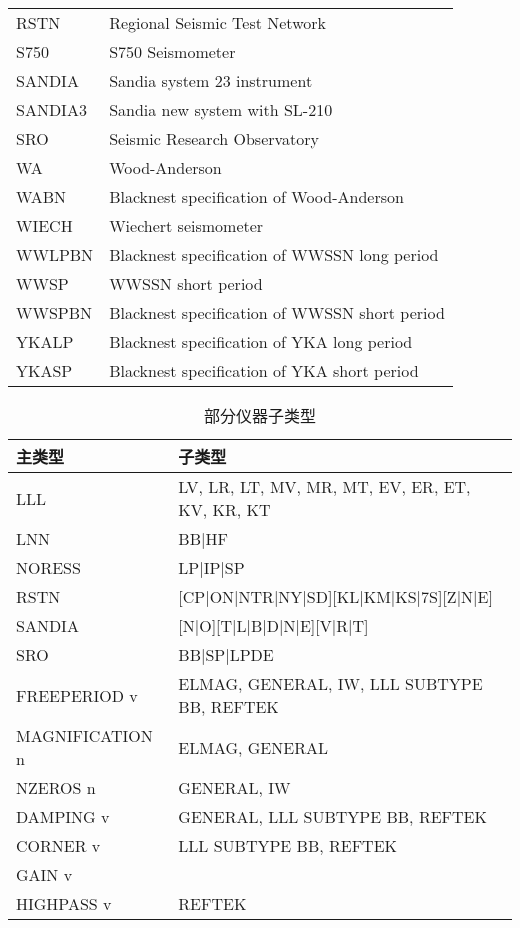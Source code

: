 \begin{table}[tp]
\begin{tabular}{ll}
RSTN     &  Regional Seismic Test Network	\\
S750     &  S750 Seismometer	\\
SANDIA   &  Sandia system 23 instrument	\\
SANDIA3  &  Sandia new system with SL-210	\\
SRO      &  Seismic Research Observatory	\\
WA       &  Wood-Anderson	\\	
WABN     &  Blacknest specification of Wood-Anderson	\\
WIECH    &  Wiechert seismometer	\\
WWLPBN   &  Blacknest specification of WWSSN long period	\\
WWSP     &  WWSSN short period	\\
WWSPBN   &  Blacknest specification of WWSSN short period	\\
YKALP    &  Blacknest specification of YKA long period	\\
YKASP    &  Blacknest specification of YKA short period	\\
\bottomrule
\end{tabular}
\end{table}

\begin{table}[htb]
\centering
\ttfamily
\small
\caption{部分仪器子类型}
\label{table:instrument-subtype}
\begin{tabular}{ll}
\toprule
主类型	&	子类型	\\
\midrule
LLL       &       LV, LR, LT, MV, MR, MT, EV, ER, ET, KV, KR, KT	\\
LNN       &    	  BB|HF	                                \\
NORESS    &   	  LP|IP|SP	                            \\
RSTN      &    	  [CP|ON|NTR|NY|SD][KL|KM|KS|7S][Z|N|E]	\\
SANDIA    &   	  [N|O][T|L|B|D|N|E][V|R|T]	            \\
SRO       &       BB|SP|LPDE	                        \\
FREEPERIOD v &    ELMAG, GENERAL, IW, LLL SUBTYPE BB, REFTEK    \\
MAGNIFICATION n & ELMAG, GENERAL  \\
NZEROS n &     	  GENERAL, IW	\\
DAMPING v &    	  GENERAL, LLL SUBTYPE BB, REFTEK	\\
CORNER v &    	  LLL SUBTYPE BB, REFTEK	\\
GAIN v &		    \\
HIGHPASS v &	  REFTEK	\\
\bottomrule
\end{tabular}
\end{table}

